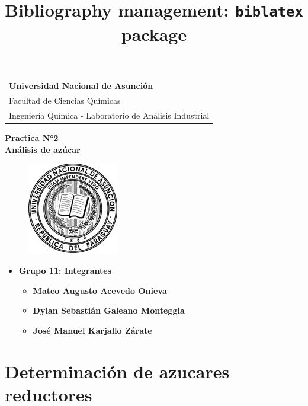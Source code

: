 \documentclass[a4paper,12pt]{article} %
\title{Bibliography management: \texttt{biblatex} package}
\begin{document}
\thispagestyle{empty} 
\begin{tabular}{p{15.5cm}}
{\large \bf Universidad Nacional de Asunción} \\
Facultad de Ciencias Químicas \\ 
Ingeniería Química - Laboratorio de Análisis Industrial \\
\hline
\end{tabular} 

\vspace*{0.3cm} %

\begin{center} 
    {\Large \bf Practica N°2  \\ \vspace{3mm} Análisis de azúcar}
    \vspace{5mm}
    \begin{figure}[H] 
	    \centering
        \includegraphics{LOGO-UNA.jpg}
    \end{figure}
\end{center}

\vspace{15mm}

\begin{itemize}
    \item \textbf{Grupo 11: Integrantes}
    \begin{itemize}
        \item{\bf Mateo Augusto Acevedo Onieva}
        \item{\bf Dylan Sebastián Galeano Monteggia}
        \item{\bf José Manuel Karjallo Zárate}
    \end{itemize}
\end{itemize}



\newpage

\section{Determinación de azucares reductores}
\end{document}
